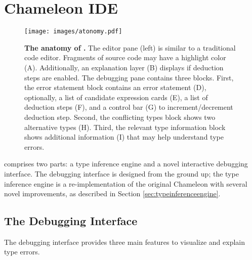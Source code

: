 \section{Chameleon IDE} \label{chameleon}
\begin{figure}[ht]
    \centering
    \texttt{[image: images/atonomy.pdf]}
    \caption[The anatomy of \chameleon{}]{
        \textbf{The anatomy of \chameleon{}.}
        The editor pane (left) is similar to a traditional code editor. Fragments of source code may have a highlight
        color (A). Additionally, an explanation layer (B) displays if deduction steps are enabled. The debugging pane contains three blocks. First, the error statement block contains an error statement (D), optionally, a list of candidate expression cards (E), a list of deduction steps (F), and a control bar (G) to increment/decrement deduction step. Second, the conflicting types block shows two alternative types (H). Third, the relevant type information block shows additional information (I) that may help understand type errors.
    }
    \label{fig:anatomy}
\end{figure}


\chameleon{} comprises two parts: a type inference engine and a novel interactive debugging interface. 
The debugging interface is designed from the ground up; the type inference engine is a re-implementation of the original Chameleon with several novel improvements, as described in Section \ref{sec:typeinferenceengine}.




\subsection{The Debugging Interface}

The \chameleon{} debugging interface provides three main features to visualize and explain type errors.

